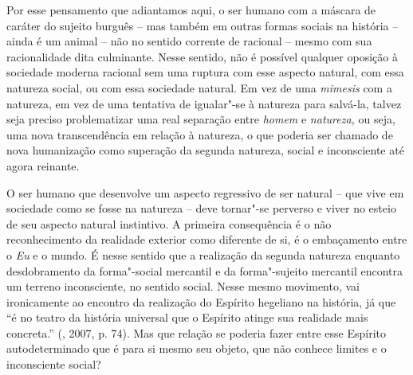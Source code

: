 {Por esse pensamento que adiantamos aqui, o ser humano com a máscara de
caráter do sujeito burguês -- mas também em outras formas sociais na
história -- ainda é um animal -- não no sentido corrente de racional --
mesmo com sua racionalidade dita culminante. Nesse sentido, não é
possível qualquer oposição à sociedade moderna racional sem uma ruptura
com esse aspecto natural, com essa natureza social, ou com essa
sociedade natural. Em vez de uma \emph{mimesis} com a natureza, em vez
de uma tentativa de igualar"-se à natureza para salvá-la, talvez seja
preciso problematizar uma real separação entre \emph{homem} e
\emph{natureza,} ou seja, uma nova transcendência em relação à natureza,
o que poderia ser chamado de nova humanização como superação da segunda
natureza, social e inconsciente até agora reinante.

O ser humano que desenvolve um aspecto regressivo de ser natural -- que
vive em sociedade como se fosse na natureza -- deve tornar"-se perverso e
viver no esteio de seu aspecto natural instintivo. A primeira
consequência é o não reconhecimento da realidade exterior como diferente
de si, é o embaçamento entre o \emph{Eu} e o mundo. É nesse sentido que
a realização da segunda natureza enquanto desdobramento da forma"-social
mercantil e da forma"-sujeito mercantil encontra um terreno inconsciente,
no sentido social. Nesse mesmo movimento, vai ironicamente ao encontro
da realização do Espírito hegeliano na história, já que ``é no teatro da
história universal que o Espírito atinge sua realidade mais concreta.''
(, 2007, p. 74). Mas que relação se poderia fazer entre esse
Espírito autodeterminado que é para si mesmo seu objeto, que não conhece
limites e o inconsciente social?

}
